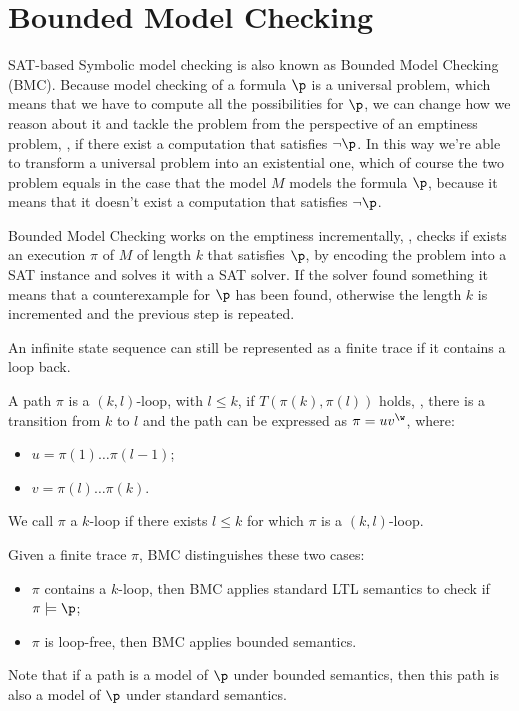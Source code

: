 \documentclass[oneside]{academica}
\begin{document}
\section{Bounded Model Checking}

SAT-based Symbolic model checking is also known as Bounded Model Checking (BMC).
Because model checking of a formula $\p$ is a universal problem, which means that we have to compute all the possibilities for $\p$, we can change how we reason about it and tackle the problem from the perspective of an emptiness problem, \ie, if there exist a computation that satisfies $\neg \p$.
In this way we're able to transform a universal problem into an existential one, which of course the two problem equals in the case that the model $M$ models the formula $\p$, because it means that it doesn't exist a computation that satisfies $\neg \p$.

Bounded Model Checking works on the emptiness incrementally, \ie, checks if exists an execution $\pi$ of $M$ of length $k$ that satisfies $\p$, by encoding the problem into a SAT instance and solves it with a SAT solver.
If the solver found something it means that a counterexample for $\p$ has been found, otherwise the length $k$ is incremented and the previous step is repeated.

An infinite state sequence can still be represented as a finite trace if it contains a loop back.

\begin{definition*}
  A path $\pi$ is a $(k,l)$-loop, with $l \leq k$, if $T(\pi(k),\pi(l))$ holds, \ie, there is a transition from $k$ to $l$ and the path can be expressed as $\pi = u v^\w$, where:
  \begin{itemize}
    \item $u = \pi(1)\dots\pi(l-1)$;
    \item $v = \pi(l)\dots\pi(k)$.
  \end{itemize}
  We call $\pi$ a $k$-loop if there exists $l \leq k$ for which $\pi$ is a $(k,l)$-loop.
  \begin{center}
    
  \end{center}
\end{definition*}

Given a finite trace $\pi$, BMC distinguishes these two cases:
\begin{itemize}
  \item $\pi$ contains a $k$-loop, then BMC applies standard LTL semantics to check if $\pi \models \p$;
  \item $\pi$ is loop-free, then BMC applies bounded semantics.
\end{itemize}
Note that if a path is a model of $\p$ under bounded semantics, then this path is also a model of $\p$ under standard semantics.
\end{document}
